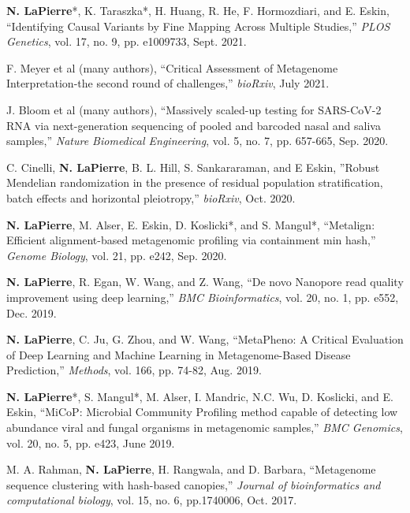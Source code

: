 \documentclass[margin, 10pt]{res} %
\begin{document}
\begin{resume}
\textbf{N. LaPierre}*, K. Taraszka*, H. Huang, R. He, F. Hormozdiari, and E. Eskin, ``Identifying Causal Variants by Fine Mapping Across Multiple Studies,'' \emph{PLOS Genetics}, vol. 17, no. 9, pp. e1009733, Sept. 2021.

F. Meyer et al (many authors), ``Critical Assessment of Metagenome Interpretation-the second round of challenges,'' \emph{bioRxiv}, July 2021.

J. Bloom et al (many authors), ``Massively scaled-up testing for SARS-CoV-2 RNA via next-generation sequencing of pooled and barcoded nasal and saliva samples,'' \emph{Nature Biomedical Engineering}, vol. 5, no. 7, pp. 657-665, Sep. 2020.

C. Cinelli, \textbf{N. LaPierre}, B. L. Hill, S. Sankararaman, and E Eskin, ''Robust Mendelian randomization in the presence of residual population stratification, batch effects and horizontal pleiotropy,'' \emph{bioRxiv}, Oct. 2020.

\textbf{N. LaPierre}, M. Alser, E. Eskin, D. Koslicki*, and S. Mangul*, ``Metalign: Efficient alignment-based metagenomic profiling via containment min hash,'' \emph{Genome Biology}, vol. 21, pp. e242, Sep. 2020.


\textbf{N. LaPierre}, R. Egan, W. Wang, and Z. Wang, ``De novo Nanopore read quality improvement using deep learning,'' \emph{BMC Bioinformatics}, vol. 20, no. 1, pp. e552, Dec. 2019.

\textbf{N. LaPierre}, C. Ju, G. Zhou, and W. Wang, ``MetaPheno: A Critical Evaluation of Deep Learning and Machine Learning in Metagenome-Based Disease Prediction,'' \emph{Methods}, vol. 166, pp. 74-82, Aug. 2019.

\textbf{N. LaPierre}*, S. Mangul*, M. Alser, I. Mandric, N.C. Wu, D. Koslicki, and E. Eskin, ``MiCoP: Microbial Community Profiling method capable of detecting low abundance viral and fungal organisms in metagenomic samples,'' \emph{BMC Genomics}, vol. 20, no. 5, pp. e423, June 2019.

M. A. Rahman, \textbf{N. LaPierre}, H. Rangwala, and D. Barbara, ``Metagenome sequence clustering with hash-based canopies,'' \emph{Journal of bioinformatics and computational biology}, vol. 15, no. 6, pp.1740006, Oct. 2017.


\end{resume}
\end{document}
